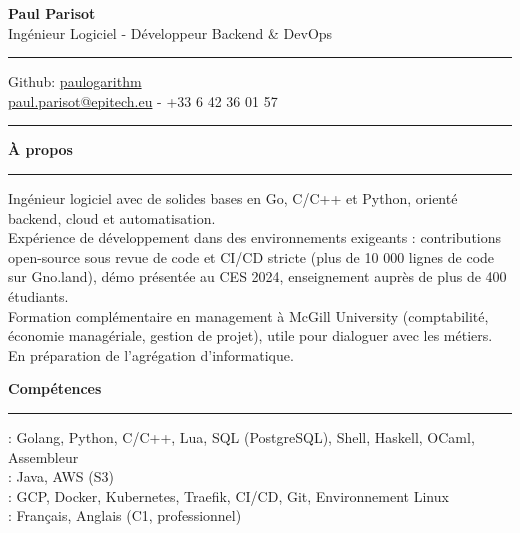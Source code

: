 \documentclass[9pt]{extarticle}
\begin{document}
\begin{center}
	{\huge\bfseries Paul Parisot}
	\\[9pt]
	{\Large Ingénieur Logiciel - Développeur Backend \& DevOps}
	\\
\end{center}

\par\vspace{-5pt}
\rule{\linewidth}{0.4pt}
\par\vspace{-5pt}

\begin{center}
	Github: \href{https://github.com/paulogarithm}{paulogarithm}
	\\
	\href{mailto:paul.parisot@epitech.eu}{paul.parisot@epitech.eu} - +33 6 42 36 01 57
	\\
\end{center}

\par\vspace{-10pt}
\rule{\linewidth}{0.4pt}
\par\vspace{7pt}

{\large\bfseries À propos}
\par\vspace{-8pt}
\rule{\linewidth}{0.4pt}
\par\vspace{5pt}

Ingénieur logiciel avec de solides bases en Go, C/C++ et Python, orienté backend, cloud et automatisation.
\\
Expérience de développement dans des environnements exigeants : contributions open-source sous revue de code et CI/CD stricte (plus de 10 000 lignes de code sur Gno.land), démo présentée au CES 2024, enseignement auprès de plus de 400 étudiants.
\\
Formation complémentaire en management à McGill University (comptabilité, économie managériale, gestion de projet), utile pour dialoguer avec les métiers. En préparation de l'agrégation d'informatique.
\par\vspace{5pt}

{\large\bfseries Compétences}
\par\vspace{-8pt}
\rule{\linewidth}{0.4pt}
\par\vspace{5pt}

\hspace*{5pt}{\bfseries Maîtrise}: Golang, Python, C/C++, Lua, SQL (PostgreSQL), Shell, Haskell, OCaml, Assembleur
\\
\hspace*{5pt}{\bfseries Notions}: Java, AWS (S3)
\\
\hspace*{5pt}{\bfseries Cloud \& DevOps}: GCP, Docker, Kubernetes, Traefik, CI/CD, Git, Environnement Linux
\\
\hspace*{5pt}{\bfseries Langues}: Français, Anglais (C1, professionnel)
\end{document}
